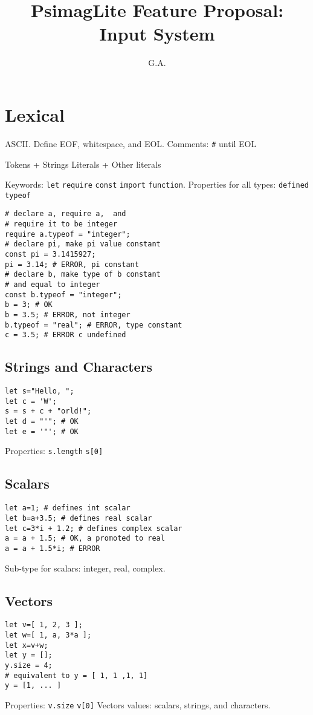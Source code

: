 \documentclass[twocolumn]{article}
\begin{document}
\title{PsimagLite Feature Proposal:
Input System}
\author{G.A.}
\maketitle

\section{Lexical}
ASCII.
Define EOF, whitespace, and EOL.
Comments: \verb!#! until EOL

Tokens + Strings Literals + Other literals

Keywords:
\verb!let! \verb!require! \verb!const! \verb!import! \verb!function!.
Properties for all types: \verb!defined! \verb!typeof!
\begin{verbatim}
# declare a, require a,  and
# require it to be integer
require a.typeof = "integer";
# declare pi, make pi value constant
const pi = 3.1415927;
pi = 3.14; # ERROR, pi constant
# declare b, make type of b constant 
# and equal to integer
const b.typeof = "integer"; 
b = 3; # OK
b = 3.5; # ERROR, not integer
b.typeof = "real"; # ERROR, type constant
c = 3.5; # ERROR c undefined
\end{verbatim}

\subsection{Strings and Characters} 
\begin{verbatim}
let s="Hello, ";
let c = 'W';
s = s + c + "orld!";
let d = "'"; # OK
let e = '"'; # OK 
\end{verbatim}
Properties: \verb!s.length! \verb!s[0]!

\subsection{Scalars} 
\begin{verbatim}
let a=1; # defines int scalar
let b=a+3.5; # defines real scalar
let c=3*i + 1.2; # defines complex scalar
a = a + 1.5; # OK, a promoted to real
a = a + 1.5*i; # ERROR
\end{verbatim}
Sub-type for scalars: integer, real, complex.

\subsection{Vectors} 
\begin{verbatim}
let v=[ 1, 2, 3 ];
let w=[ 1, a, 3*a ];
let x=v+w;
let y = [];
y.size = 4;
# equivalent to y = [ 1, 1 ,1, 1]
y = [1, ... ] 
\end{verbatim}
Properties: \verb!v.size! \verb!v[0]!
Vectors values: scalars, strings, and characters.
\end{document}
